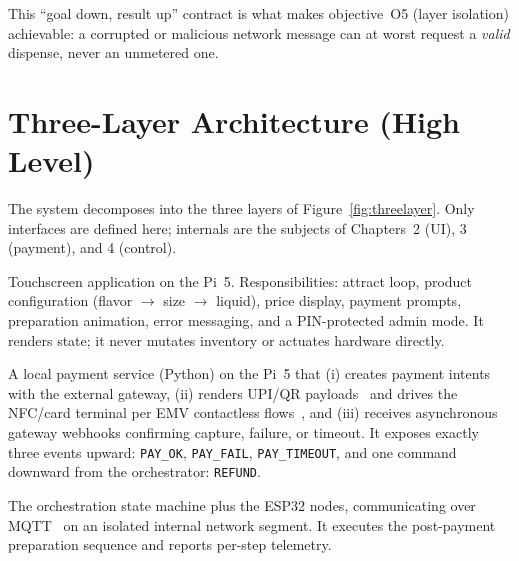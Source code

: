 This ``goal down, result up'' contract is what makes objective~O5 (layer
isolation) achievable: a corrupted or malicious network message can at worst
request a \emph{valid} dispense, never an unmetered one.

\section{Three-Layer Architecture (High Level)}
\label{sec:threelayer}

The system decomposes into the three layers of
Figure~\ref{fig:threelayer}. Only interfaces are defined here; internals are
the subjects of Chapters~2 (UI), 3 (payment), and 4 (control).

\begin{description}[itemsep=2pt]
  \item[Layer 1 --- User Interface (Chapter 2).] Touchscreen application on
    the Pi~5. Responsibilities: attract loop, product configuration
    (flavor $\rightarrow$ size $\rightarrow$ liquid), price display, payment
    prompts, preparation animation, error messaging, and a PIN-protected
    admin mode. It renders state; it never mutates inventory or actuates
    hardware directly.
  \item[Layer 2 --- Payment (Chapter 3).] A local payment service (Python)
    on the Pi~5 that (i) creates payment intents with the external gateway,
    (ii) renders UPI/QR payloads~\cite{npci_upi} and drives the NFC/card
    terminal per EMV contactless flows~\cite{emvco_contactless}, and
    (iii) receives asynchronous gateway webhooks confirming capture,
    failure, or timeout. It exposes exactly three events upward:
    \texttt{PAY\_OK}, \texttt{PAY\_FAIL}, \texttt{PAY\_TIMEOUT}, and one
    command downward from the orchestrator: \texttt{REFUND}.
  \item[Layer 3 --- Control (Chapter 4).] The orchestration state machine
    plus the ESP32 nodes, communicating over MQTT~\cite{oasis2019mqtt} on an
    isolated internal network segment. It executes the post-payment
    preparation sequence and reports per-step telemetry.
\end{description}

